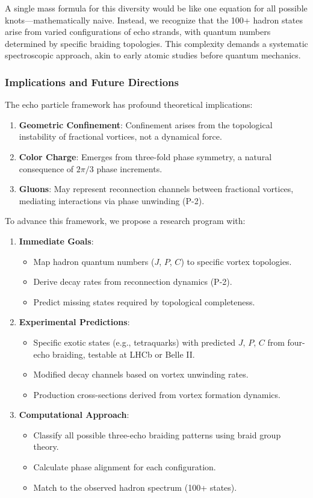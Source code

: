 A single mass formula for this diversity would be like one equation for all possible knots---mathematically naive. Instead, we recognize that the 100+ hadron states arise from varied configurations of echo strands, with quantum numbers determined by specific braiding topologies. This complexity demands a systematic spectroscopic approach, akin to early atomic studies before quantum mechanics.

\subsubsection{Implications and Future Directions}

The echo particle framework has profound theoretical implications:

\begin{enumerate}
\item \textbf{Geometric Confinement}: Confinement arises from the topological instability of fractional vortices, not a dynamical force.
\item \textbf{Color Charge}: Emerges from three-fold phase symmetry, a natural consequence of $2\pi/3$ phase increments.
\item \textbf{Gluons}: May represent reconnection channels between fractional vortices, mediating interactions via phase unwinding (P-2).
\end{enumerate}

To advance this framework, we propose a research program with:

\begin{enumerate}
\item \textbf{Immediate Goals}:
   \begin{itemize}
   \item Map hadron quantum numbers ($J$, $P$, $C$) to specific vortex topologies.
   \item Derive decay rates from reconnection dynamics (P-2).
   \item Predict missing states required by topological completeness.
   \end{itemize}
\item \textbf{Experimental Predictions}:
   \begin{itemize}
   \item Specific exotic states (e.g., tetraquarks) with predicted $J$, $P$, $C$ from four-echo braiding, testable at LHCb or Belle II.
   \item Modified decay channels based on vortex unwinding rates.
   \item Production cross-sections derived from vortex formation dynamics.
   \end{itemize}
\item \textbf{Computational Approach}:
   \begin{itemize}
   \item Classify all possible three-echo braiding patterns using braid group theory.
   \item Calculate phase alignment for each configuration.
   \item Match to the observed hadron spectrum (100+ states).
   \end{itemize}
\end{enumerate}

